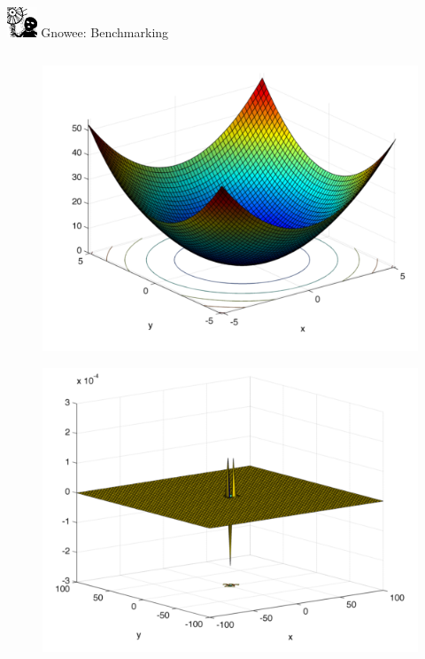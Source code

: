 \documentclass[xcolor=x11names,compress]{beamer}
\renewcommand{\(}{\begin{columns}}
\renewcommand{\)}{\end{columns}}
\newcommand{\<}[1]{\begin{column}{#1}}
\renewcommand{\>}{\end{column}}
\begin{document}
\begin{frame}{\includegraphics[width=0.35in]{../figs/Gnowee.png} Gnowee: Benchmarking \cite{Walton2013a,Yang2014,Civicioglu2013}}
\begin{columns}
    \begin{column}{0.33\linewidth}
      \vspace{-.55cm} 
      \begin{figure}[htp]
        \centering
        \includegraphics[width=1.0\textwidth, height=0.25\textheight]{../figs/DeJong.png} 
        \vspace{-0.35cm}
      \end{figure}        
      \vspace{-1.05cm} 
      \begin{figure}[htp]
        \centering
        \includegraphics[width=1.0\textwidth, height=0.25\textheight]{../figs/Easom.png} 

\end{figure}
\end{column}
\end{columns}
\end{frame}
\end{document}
